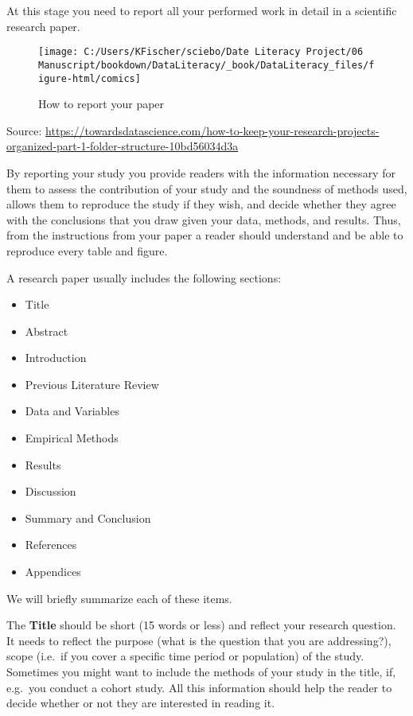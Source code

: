 \documentclass[
]{book}
\providecommand{\tightlist}{%
  \setlength{\itemsep}{0pt}\setlength{\parskip}{0pt}}
\begin{document}
At this stage you need to report all your performed work in detail in a
scientific research paper.

\begin{figure}

{\centering \texttt{[image: C:/Users/KFischer/sciebo/Date Literacy Project/06 Manuscript/bookdown/DataLiteracy/\_book/DataLiteracy\_files/figure-html/comics]} 

}

\caption{How to report your paper}\label{fig:writepaper}
\end{figure}

Source:
\url{https://towardsdatascience.com/how-to-keep-your-research-projects-organized-part-1-folder-structure-10bd56034d3a}

By reporting your study you provide readers with the information
necessary for them to assess the contribution of your study and the
soundness of methods used, allows them to reproduce the study if they
wish, and decide whether they agree with the conclusions that you draw
given your data, methods, and results. Thus, from the instructions from
your paper a reader should understand and be able to reproduce every
table and figure.

A research paper usually includes the following sections:

\begin{itemize}
\tightlist
\item
  Title
\item
  Abstract
\item
  Introduction
\item
  Previous Literature Review
\item
  Data and Variables
\item
  Empirical Methods
\item
  Results
\item
  Discussion
\item
  Summary and Conclusion
\item
  References
\item
  Appendices
\end{itemize}

We will briefly summarize each of these items.

The \textbf{Title} should be short (15 words or less) and reflect your
research question. It needs to reflect the purpose (what is the question
that you are addressing?), scope (i.e.~if you cover a specific time
period or population) of the study. Sometimes you might want to include
the methods of your study in the title, if, e.g.~you conduct a cohort
study. All this information should help the reader to decide whether or
not they are interested in reading it.
\end{document}
